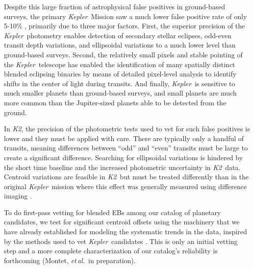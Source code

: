 \documentclass[12pt,preprint]{aastex}
\newcommand{\project}[1]{\textsl{#1}} %
\newcommand{\kepler}{\project{Kepler}}
\newcommand{\KT}{\project{K2}}
\newcommand{\foreign}[1]{\emph{#1}}
\newcommand{\etal}{\foreign{et\,al.}}
\begin{document}
Despite this large fraction of astrophysical false positives in
ground-based surveys, the primary \kepler\ Mission saw a much lower
false positive rate of only 5-10\% \citep{Morton:2011, Fressin:2013},
primarily due to three major factors.  First, the superior precision
of the \kepler\ photometry enables detection of secondary stellar
eclipses, odd-even transit depth variations, and ellipsoidal
variations \citep{Batalha:2010} to a much lower level than
ground-based surveys. Second, the relatively small pixels and stable
pointing of the \kepler\ telescope has enabled the identification of
many spatially distinct blended eclipsing binaries by means of
detailed pixel-level analysis \citep{Bryson:2013} to identify shifts
in the center of light during transits.  And finally, \kepler\ is
sensitive to much smaller planets than ground-based surveys, and small
planets are much more common than the Jupiter-sized planets able to be
detected from the ground.

In \KT, the precision of the photometric tests used to vet for such
false positives  is lower and they must be applied
with care.  There are typically only a handful of transits, meaning
differences between ``odd'' and ``even'' transits must be large to
create a significant difference. Searching for ellipsoidal variations
is hindered by the short time baseline and the increased photometric
uncertainty in \KT\ data.  Centroid variations are feasible in
\KT\ but must be treated differently than in the original
\kepler\ mission where this effect was generally measured using
difference imaging \citep{Batalha:2010, Bryson:2013}.

To do first-pass vetting for blended EBs among our catalog of
planetary candidates, we test for significant centroid offsets using
the machinery that we have already established for modeling the
systematic trends in the data, inspired by the methods used to vet
\kepler\ candidates \citep{Bryson:2013}.  This is only an initial vetting step
and a more complete characterization of our catalog's reliability is
forthcoming (Montet, \etal\ in preparation).
\end{document}
